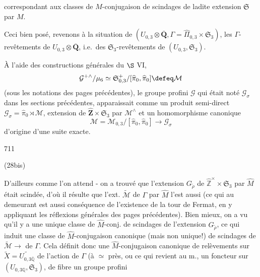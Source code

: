 \newpage


correspondant aux classes de $M$-conjugaison de scindages de ladite extension $\mathfrak{S}$ par $M$.

Ceci bien posé, revenons à la situation de $(U_{0,3} \otimes \overline{\mathbf{Q}}, \Gamma = \widehat{\Pi}_{0,3} \times \mathfrak{S}_3)$, les $\Gamma$-revêtements de $U_{0,3} \otimes \overline{\mathbf{Q}}$, i.e.\ des $\mathfrak{S}_3$-revêtements de $(U_{0,3}, \mathfrak{S}_3)$.  

À l'aide des constructions générales du $\S$ VI,
$$
\mathcal{G}^{+\wedge} / \mu_6 \simeq \mathfrak{S}_{0,3}^+ / [\widehat{\pi}_0, \widehat{\pi}_0] \defeq \mathcal{M}
$$
(sous les notations des pages précédentes), le groupe profini $\mathcal{G}$ qui était noté $\mathcal{G}_{\sigma}$ dans les sections précédentes, apparaissait comme un produit semi-direct $\mathcal{G}_{\sigma} = \widehat{\pi}_0 \rtimes \mathcal{M}$, extension de $\widehat{\mathbf{Z}} \times \mathfrak{S}_3$ par $\mathcal{M}^\wedge$ et un homomorphisme canonique
$$
\mathcal{M} = \mathcal{M}_{0,3} / [\widehat{\pi}_0, \widehat{\pi}_0] \to \mathcal{G}_{\sigma}
$$
d'origine d'une suite exacte.

\newpage


711

(28bis)

D'ailleurs comme l'on attend - on a trouvé que
l'extension $G_{\tilde{\rho}}$ de $\hat{\mathbb{Z}}^\times \times \mathfrak{S}_3$ par $\hat{M}$ était
scindée, d'où il résulte que
l'ext. $\tilde{\mathcal{M}}$ de $\Gamma$ par $\hat{M}$ l'est aussi
(ce qui au demeurant est aussi conséquence de
l'existence de la tour de Fermat, en
y appliquant les réflexions générales
des pages précédentes). Bien mieux,
on a vu qu'il y a une unique classe
de $\hat{M}$-conj. de scindages de l'extension
$G_{\tilde{\rho}}$, ce qui induit une classe de
$\hat{M}$-conjugaison canonique (mais non
unique!) de scindages de $\tilde{\mathcal{M}} \to$ 
de $\Gamma$. Cela définit donc une
$\hat{M}$-conjugaison canonique de relèvements
sur $\tilde{X} = \widetilde{U_{0,3 \overline{\mathbb{Q}}}}$
de l'action de $\Gamma$ (à $\simeq$ près, ou ce
qui revient au m., un foncteur sur
$(U_{0,3 \mathbb{Q}}, \mathfrak{S}_3)$, de fibre un groupe profini

